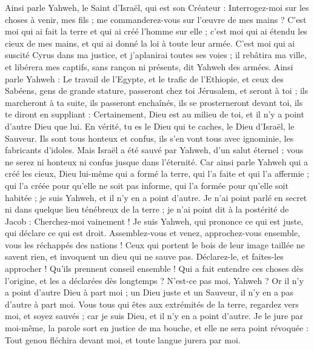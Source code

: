 \begin{multicols}{2}
Ainsi parle Yahweh, le Saint d'Israël, qui est son Créateur : Interrogez-moi sur les choses à venir, mes fils ; me commanderez-vous sur l'œuvre de mes mains ?
C'est moi qui ai fait la terre et qui ai créé l'homme sur elle ; c'est moi qui ai étendu les cieux de mes mains, et qui ai donné la loi à toute leur armée.
C'est moi qui ai suscité Cyrus dans ma justice, et j'aplanirai toutes ses voies ; il rebâtira ma ville, et libérera mes captifs, sans rançon ni présents, dit Yahweh des armées.
Ainsi parle Yahweh : Le travail de l'Egypte, et le trafic de l'Ethiopie, et ceux des Sabéens, gens de grande stature, passeront chez toi Jérusalem, et seront à toi ; ils marcheront à ta suite, ils passeront enchaînés, ils se prosterneront devant toi, ils te diront en suppliant : Certainement, Dieu est au milieu de toi, et il n'y a point d'autre Dieu que lui.
En vérité, tu es le Dieu qui te caches, le Dieu d'Israël, le Sauveur.
Ils sont tous honteux et confus, ils s'en vont tous avec ignominie, les fabricants d'idoles.
Mais Israël a été sauvé par Yahweh, d'un salut éternel ; vous ne serez ni honteux ni confus jusque dans l'éternité.
Car ainsi parle Yahweh qui a créé les cieux, Dieu lui-même qui a formé la terre, qui l'a faite et qui l'a affermie ; qui l'a créée pour qu'elle ne soit pas informe, qui l'a formée pour qu'elle soit habitée ; je suis Yahweh, et il n'y en a point d'autre.
Je n'ai point parlé en secret ni dans quelque lieu ténébreux de la terre ; je n'ai point dit à la postérité de Jacob : Cherchez-moi vainement ! Je suis Yahweh, qui prononce ce qui est juste, qui déclare ce qui est droit.
Assemblez-vous et venez, approchez-vous ensemble, vous les réchappés des nations ! Ceux qui portent le bois de leur image taillée ne savent rien, et invoquent un dieu qui ne sauve pas.
Déclarez-le, et faites-les approcher ! Qu'ils prennent conseil ensemble ! Qui a fait entendre ces choses dès l'origine, et les a déclarées dès longtemps ? N'est-ce pas moi, Yahweh ? Or il n'y a point d'autre Dieu à part moi ; un Dieu juste et un Sauveur, il n'y en a pas d'autre à part moi.
Vous tous qui êtes aux extrémités de la terre, regardez vers moi, et soyez sauvés ; car je suis Dieu, et il n'y en a point d'autre.
Je le jure par moi-même, la parole sort en justice de ma bouche, et elle ne sera point révoquée : Tout genou fléchira devant moi, et toute langue jurera par moi.

\end{multicols}
